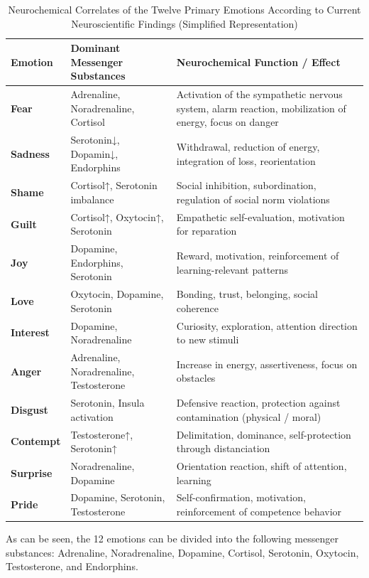 \begin{table}[H]
\renewcommand{\arraystretch}{1.5}
\centering
\begin{tabular}{L{3cm}|L{6cm}|L{6cm}}
\textbf{Emotion} & \textbf{Dominant Messenger Substances} & \textbf{Neurochemical Function / Effect} \\
\hline
\textbf{Fear} & Adrenaline, Noradrenaline, Cortisol & Activation of the sympathetic nervous system, alarm reaction, mobilization of energy, focus on danger \\
\textbf{Sadness} & Serotonin↓, Dopamin↓, Endorphins & Withdrawal, reduction of energy, integration of loss, reorientation \\
\textbf{Shame} & Cortisol↑, Serotonin imbalance & Social inhibition, subordination, regulation of social norm violations \\
\textbf{Guilt} & Cortisol↑, Oxytocin↑, Serotonin & Empathetic self-evaluation, motivation for reparation \\
\textbf{Joy} & Dopamine, Endorphins, Serotonin & Reward, motivation, reinforcement of learning-relevant patterns \\
\textbf{Love} & Oxytocin, Dopamine, Serotonin & Bonding, trust, belonging, social coherence \\
\textbf{Interest} & Dopamine, Noradrenaline & Curiosity, exploration, attention direction to new stimuli \\
\textbf{Anger} & Adrenaline, Noradrenaline, Testosterone & Increase in energy, assertiveness, focus on obstacles \\
\textbf{Disgust} & Serotonin, Insula activation & Defensive reaction, protection against contamination (physical / moral) \\
\textbf{Contempt} & Testosterone↑, Serotonin↑ & Delimitation, dominance, self-protection through distanciation \\
\textbf{Surprise} & Noradrenaline, Dopamine & Orientation reaction, shift of attention, learning \\
\textbf{Pride} & Dopamine, Serotonin, Testosterone & Self-confirmation, motivation, reinforcement of competence behavior \\
\end{tabular}
\caption{Neurochemical Correlates of the Twelve Primary Emotions According to Current Neuroscientific Findings (Simplified Representation)}
\label{tab:neurochemie_primäremotionen}
\end{table}

As can be seen, the 12 emotions can be divided into the following messenger substances: Adrenaline, Noradrenaline, Dopamine, Cortisol, Serotonin, Oxytocin, Testosterone, and Endorphins.

